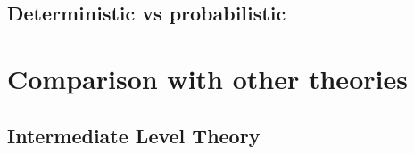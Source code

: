 \documentclass[utf8]{article}
\begin{document}
		
		
			
		\subsection{Deterministic vs probabilistic}
		\cite{dehaene2017consciousness}
		\cite{vul2008temporal, moreno2011bayesian, asplund2014attentional, vul2009attention}
		
	\section{Comparison with other theories}
		\subsection{Intermediate Level Theory}
		
\end{document}
